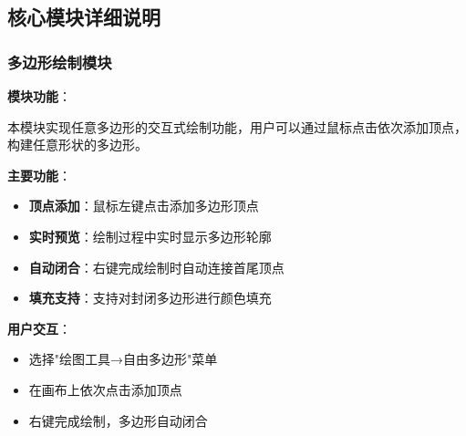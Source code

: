 \documentclass[12pt,a4paper]{article}
\begin{document}
\subsection{核心模块详细说明}


\begin{tcolorbox}
\subsubsection{多边形绘制模块}
\textbf{模块功能}：

本模块实现任意多边形的交互式绘制功能，用户可以通过鼠标点击依次添加顶点，构建任意形状的多边形。

\textbf{主要功能}：
\begin{itemize}
    \item \textbf{顶点添加}：鼠标左键点击添加多边形顶点
    \item \textbf{实时预览}：绘制过程中实时显示多边形轮廓
    \item \textbf{自动闭合}：右键完成绘制时自动连接首尾顶点
    \item \textbf{填充支持}：支持对封闭多边形进行颜色填充
\end{itemize}

\textbf{用户交互}：
\begin{itemize}
    \item 选择"绘图工具→自由多边形"菜单
    \item 在画布上依次点击添加顶点
    \item 右键完成绘制，多边形自动闭合
\end{itemize}
\end{tcolorbox}
\end{document}

